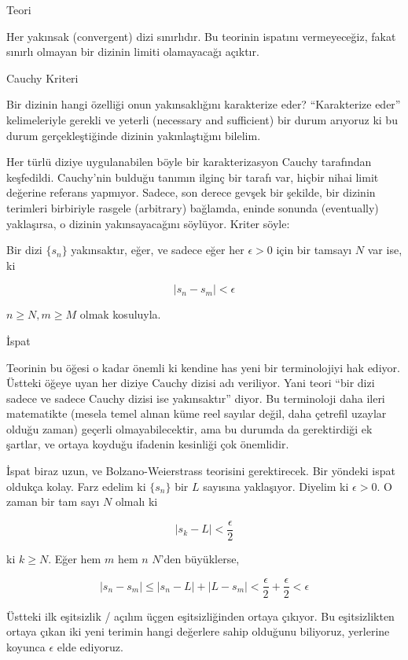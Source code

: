 \documentclass[12pt,fleqn]{article}\usepackage{../../common}
\begin{document}
Teori 

Her yakınsak (convergent) dizi sınırlıdır. Bu teorinin ispatını
vermeyeceğiz, fakat sınırlı olmayan bir dizinin limiti olamayacağı
açıktır. 

Cauchy Kriteri 

Bir dizinin hangi özelliği onun yakınsaklığını karakterize eder?
``Karakterize eder'' kelimeleriyle gerekli ve yeterli (necessary and
sufficient) bir durum arıyoruz ki bu durum gerçekleştiğinde dizinin
yakınlaştığını bilelim. 

Her türlü diziye uygulanabilen böyle bir karakterizasyon Cauchy tarafından
keşfedildi. Cauchy'nin bulduğu tanımın ilginç bir tarafı var, hiçbir nihai
limit değerine referans yapmıyor. Sadece, son derece gevşek bir şekilde,
bir dizinin terimleri birbiriyle rasgele (arbitrary) bağlamda, eninde
sonunda (eventually) yaklaşırsa, o dizinin yakınsayacağını söylüyor. Kriter
söyle:

Bir dizi $\{s_n\}$ yakınsaktır, eğer, ve sadece eğer her $\epsilon > 0$
için bir tamsayı $N$ var ise, ki 

$$ |s_n - s_m| < \epsilon $$

$n \ge N, m \ge M$ olmak kosuluyla. 

İspat

Teorinin bu öğesi o kadar önemli ki kendine has yeni bir terminolojiyi hak
ediyor. Üstteki öğeye uyan her diziye Cauchy dizisi adı veriliyor. Yani
teori ``bir dizi sadece ve sadece Cauchy dizisi ise yakınsaktır''
diyor. Bu terminoloji daha ileri matematikte (mesela temel alınan küme reel
sayılar değil, daha çetrefil uzaylar olduğu zaman) geçerli
olmayabilecektir, ama bu durumda da gerektirdiği ek şartlar, ve ortaya
koyduğu ifadenin kesinliği çok önemlidir.

İspat biraz uzun, ve Bolzano-Weierstrass teorisini gerektirecek. Bir
yöndeki ispat oldukça kolay. Farz edelim ki $\{s_n\}$ bir $L$ sayısına
yaklaşıyor. Diyelim ki $\epsilon > 0$. O zaman bir tam sayı $N$ olmalı ki 

$$ |s_k - L| < \frac{\epsilon}{2} $$

ki $k \ge N$. Eğer hem $m$ hem $n$ $N$'den büyüklerse, 

$$ |s_n - s_m| \le |s_n - L| + |L - s_m| < 
\frac{\epsilon}{2} + \frac{\epsilon}{2} <
\epsilon
$$

Üstteki ilk eşitsizlik / açılım üçgen eşitsizliğinden ortaya çıkıyor. Bu
eşitsizlikten ortaya çıkan iki yeni terimin hangi değerlere sahip olduğunu
biliyoruz, yerlerine koyunca $\epsilon$ elde ediyoruz. 
\end{document}
